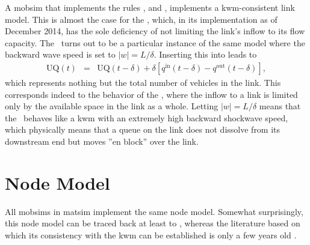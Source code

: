 A \gls{mobsim} that implements the rules , 
and ,  implements a \gls{kwm}-consistent
link model. This is almost the case for the \DOUBLEQUEUESIM,
which, in its implementation as of December 2014, has the sole deficiency
of not limiting the link's inflow to its flow capacity. 
%
The \SINGLEQUEUESIM\ turns out to be a
particular instance of the same model where the backward wave speed
is set to $\left|w\right|=L/\delta$. Inserting this into 
leads to
\begin{eqnarray}
\text{UQ}(t) & = & \text{UQ}(t-\delta)+\delta\left[q^{\text{in}}(t-\delta)-q^{\text{out}}(t-\delta)\right],
\end{eqnarray}
which represents nothing but the total number of vehicles in the link.
This corresponds indeed to the behavior of the \SINGLEQUEUESIM,
where the inflow to a link is limited only by the available space
in the link as a whole. Letting $\left|w\right|=L/\delta$ means that
the \SINGLEQUEUESIM\ behaves like a \gls{kwm} with an extremely
high backward shockwave speed, which physically means that a queue
on the link does not dissolve from its downstream end but moves {}''en
block'' over the link. 

\section{\label{sec:Node-model}Node Model}
All \glspl{mobsim} in \gls{matsim} implement the same node model. Somewhat surprisingly,
this node model can be traced back at least to , whereas
the literature based on which its consistency with the \gls{kwm} can be
established is only a few years old \citep{tampere-2010b,floetteroed-2011a,corthout-2012}. 

